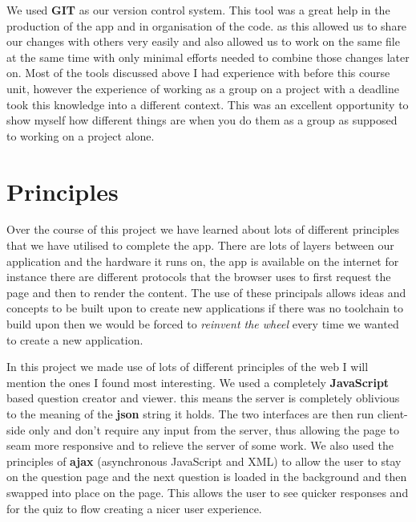 \documentclass[11pt]{article}
\begin{document}
We used \textbf{GIT} as our version control system. This tool was a great help in the production of the app and in organisation of the code. as this allowed us to share our changes with others very easily and also allowed us to work on the same file at the same time with only minimal efforts needed to combine those changes later on.
Most of the tools discussed above I had experience with before this course unit, however the experience of working as a group on a project with a deadline took this  knowledge into a different context. This was an excellent opportunity to show myself how different things are when you do them as a group as supposed to working on a project alone.

\section{Principles}

Over the course of this project we have learned about lots of different principles that we have utilised to complete the app. There are lots of layers between our application and the hardware it runs on, the app is available on the internet for instance there are different protocols that the browser uses to first request the page and then to render the content. The use of these principals allows ideas and concepts to be built upon to create new applications if there was no toolchain to build upon then we would be forced to \textit{reinvent the wheel} every time we wanted to create a new application.

In this project we made use of lots of different principles of the web I will mention the ones I found most interesting. We used a completely \textbf{JavaScript} based question creator and viewer. this means the server is completely oblivious to the meaning of the \textbf{json} string it holds. The two interfaces are then run client-side only and don't require any input from the server, thus allowing the page to seam more responsive and to relieve the server of some work. We also used the principles of \textbf{ajax} (asynchronous JavaScript and XML) to allow the user to stay on the question page and the next question is loaded in the background and then swapped into place on the page. This allows the user to see quicker responses and for the quiz to flow creating a nicer user experience.
\end{document}
